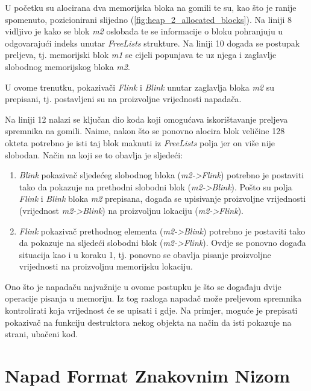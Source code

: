 \documentclass[times, utf8, diplomski, numeric]{fer}
\begin{document}
U početku su alocirana dva memorijska bloka na gomili te su, kao
što je ranije spomenuto, pozicionirani slijedno
(\ref{fig:heap_2_allocated_blocks}). Na liniji 8 vidljivo je kako
se blok \emph{m2} oslobađa te se informacije o bloku pohranjuju u
odgovarajući indeks unutar \emph{FreeLists} strukture.	Na liniji
10 događa se postupak preljeva, tj. memorijski blok \emph{m1} se
cijeli popunjava te uz njega i zaglavlje slobodnog memorijskog
bloka \emph{m2}.

U ovome trenutku, pokazivači \emph{Flink} i \emph{Blink} unutar
zaglavlja bloka \emph{m2} su prepisani, tj. postavljeni su na
proizvoljne vrijednosti napadača.

Na liniji 12 nalazi se ključan dio koda koji omogućava
iskorištavanje preljeva spremnika na gomili. Naime, nakon što se
ponovno alocira blok veličine 128 okteta potrebno je isti taj
blok maknuti iz \emph{FreeLists} polja jer on više nije slobodan.
Način na koji se to obavlja je sljedeći:

\begin{enumerate}

\item \emph{Blink} pokazivač sljedećeg slobodnog bloka
(\emph{m2->Flink}) potrebno je postaviti tako da pokazuje na
prethodni slobodni blok (\emph{m2->Blink}). Pošto su polja
\emph{Flink} i \emph{Blink} bloka \emph{m2} prepisana, događa se
upisivanje proizvoljne vrijednosti (vrijednost \emph{m2->Blink})
na proizvoljnu lokaciju (\emph{m2->Flink}).

\item \emph{Flink} pokazivač prethodnog elementa
(\emph{m2->Blink}) potrebno je postaviti tako da pokazuje na
sljedeći slobodni blok (\emph{m2->Flink}). Ovdje se ponovno
događa situacija kao i u koraku 1, tj. ponovno se obavlja pisanje
proizvoljne vrijednosti na proizvoljnu memorijsku lokaciju.

\end{enumerate}

Ono što je napadaču najvažnije u ovome postupku je što se
događaju dvije operacije pisanja u memoriju. Iz tog razloga
napadač može preljevom spremnika kontrolirati koja vrijednost će
se upisati i gdje. Na primjer, moguće je prepisati pokazivač na
funkciju destruktora nekog objekta na način da isti pokazuje na
strani, ubačeni kod.

\section{Napad Format Znakovnim Nizom}
\end{document}
